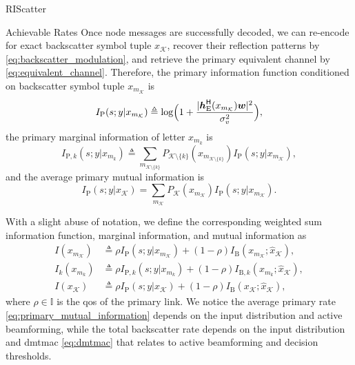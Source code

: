 \documentclass[journal]{IEEEtran}
\begin{document}
\begin{section}{RIScatter}
\begin{subsection}{Achievable Rates}
		Once node messages are successfully decoded, we can re-encode for exact backscatter symbol tuple $x_{\mathcal{K}}$, recover their reflection patterns by \eqref{eq:backscatter_modulation}, and retrieve the primary equivalent channel by \eqref{eq:equivalent_channel}.
		Therefore, the primary information function conditioned on backscatter symbol tuple $x_{m_{\mathcal{K}}}$ is
		\begin{equation}
			I_{\text{P}}(s;y|x_{m_{\mathcal{K}}}) \triangleq \log \Bigl(1 + \frac{\lvert \boldsymbol{h}_{\text{E}}^\mathsf{H}(x_{m_{\mathcal{K}}}) \boldsymbol{w} \rvert^2}{\sigma_v^2}\Bigr),
			\label{eq:primary_information_function}
		\end{equation}
		the primary marginal information of letter $x_{m_k}$ is
		\begin{equation}
			I_{\text{P},k}(s;y|x_{m_k}) \triangleq \sum_{m_{\mathcal{K} \setminus \{k\}}} P_{\mathcal{K} \setminus \{k\}}(x_{m_{\mathcal{K} \setminus \{k\}}}) I_{\text{P}}(s;y|x_{m_{\mathcal{K}}}),
			\label{eq:primary_marginal_information}
		\end{equation}
		and the average primary mutual information is
		\begin{equation}
			I_{\text{P}}(s;y|x_{\mathcal{K}}) = \sum_{m_{\mathcal{K}}} P_{\mathcal{K}}(x_{m_{\mathcal{K}}}) I_{\text{P}}(s;y|x_{m_{\mathcal{K}}}).
			\label{eq:primary_mutual_information}
		\end{equation}

		With a slight abuse of notation, we define the corresponding weighted sum information function, marginal information, and mutual information as
		\begin{align}
			I(x_{m_{\mathcal{K}}})
			 & \triangleq \rho I_{\text{P}}(s;y|x_{m_{\mathcal{K}}}) + (1 - \rho) I_{\text{B}}(x_{m_{\mathcal{K}}};\hat{x}_{\mathcal{K}}),\label{eq:weighted_sum_information_function} \\
			I_k(x_{m_k})
			 & \triangleq \rho I_{\text{P},k}(s;y|x_{m_k}) + (1 - \rho) I_{\text{B},k}(x_{m_k};\hat{x}_{\mathcal{K}}),\label{eq:weighted_sum_marginal_information}                     \\
			I(x_{\mathcal{K}})
			 & \triangleq \rho I_{\text{P}}(s;y|x_{\mathcal{K}}) + (1 - \rho) I_{\text{B}}(x_{\mathcal{K}};\hat{x}_{\mathcal{K}}),\label{eq:weighted_sum_mutual_information}
		\end{align}
		where $\rho \in \mathbb{I}$ is the \gls{qos} of the primary link.
		We notice the average primary rate \eqref{eq:primary_mutual_information} depends on the input distribution and active beamforming, while the total backscatter rate depends on the input distribution and \gls{dmtmac} \eqref{eq:dmtmac} that relates to active beamforming and decision thresholds.
		\label{st:information_theory}
	\end{subsection}
	\label{st:riscatter}
\end{section}
\end{document}
